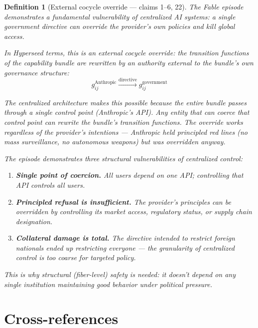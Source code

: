 \documentclass[11pt,a4paper]{article}
\newtheorem{definition}{Definition}[section]
\begin{document}
\begin{definition}[External cocycle override --- claims 1--6, 22]
\label{def:override}
The Fable episode demonstrates a fundamental vulnerability of
centralized AI systems: a single government directive can override
the provider's own policies and kill global access.

In Hyperseed terms, this is an \emph{external cocycle override}: the
transition functions of the capability bundle are rewritten by an
authority external to the bundle's own governance structure:
\[
  g_{ij}^{\text{Anthropic}} \xrightarrow{\text{directive}}
  g_{ij}^{\text{government}}
\]

The centralized architecture makes this possible because the entire
bundle passes through a single control point (Anthropic's API). Any
entity that can coerce that control point can rewrite the bundle's
transition functions. The override works regardless of the provider's
intentions --- Anthropic held principled red lines (no mass surveillance,
no autonomous weapons) but was overridden anyway.

The episode demonstrates three structural vulnerabilities of
centralized control:
\begin{enumerate}
\item \textbf{Single point of coercion.} All users depend on one API;
  controlling that API controls all users.
\item \textbf{Principled refusal is insufficient.} The provider's
  principles can be overridden by controlling its market access,
  regulatory status, or supply chain designation.
\item \textbf{Collateral damage is total.} The directive intended to
  restrict foreign nationals ended up restricting everyone --- the
  granularity of centralized control is too coarse for targeted
  policy.
\end{enumerate}

This is why structural (fiber-level) safety is needed: it doesn't
depend on any single institution maintaining good behavior under
political pressure.
\end{definition}


\section{Cross-references}
\end{document}
